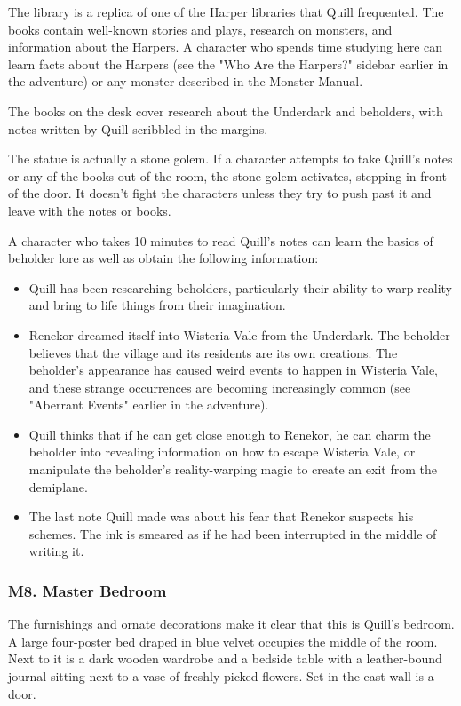 \documentclass[10pt,a4paper,twoside,bg=print,twocolumn,openany,nodeprecatedcode]{dndbook}
\begin{document}
The library is a replica of one of the Harper libraries that Quill frequented. The books contain well-known stories and plays, research on monsters, and information about the Harpers. A character who spends time studying here can learn facts about the Harpers (see the "Who Are the Harpers?" sidebar earlier in the adventure) or any monster described in the Monster Manual.

The books on the desk cover research about the Underdark and beholders, with notes written by Quill scribbled in the margins.

The statue is actually a stone golem. If a character attempts to take Quill's notes or any of the books out of the room, the stone golem activates, stepping in front of the door. It doesn't fight the characters unless they try to push past it and leave with the notes or books.

A character who takes 10 minutes to read Quill's notes can learn the basics of beholder lore as well as obtain the following information:


\begin{itemize}
\item Quill has been researching beholders, particularly their ability to warp reality and bring to life things from their imagination.
\item Renekor dreamed itself into Wisteria Vale from the Underdark. The beholder believes that the village and its residents are its own creations. The beholder's appearance has caused weird events to happen in Wisteria Vale, and these strange occurrences are becoming increasingly common (see "Aberrant Events" earlier in the adventure).
\item Quill thinks that if he can get close enough to Renekor, he can charm the beholder into revealing information on how to escape Wisteria Vale, or manipulate the beholder's reality-warping magic to create an exit from the demiplane.
\item The last note Quill made was about his fear that Renekor suspects his schemes. The ink is smeared as if he had been interrupted in the middle of writing it.
\end{itemize}

\subsubsection{M8. Master Bedroom}
\begin{DndReadAloud}{}
The furnishings and ornate decorations make it clear that this is Quill's bedroom. A large four-poster bed draped in blue velvet occupies the middle of the room. Next to it is a dark wooden wardrobe and a bedside table with a leather-bound journal sitting next to a vase of freshly picked flowers. Set in the east wall is a door.

\end{DndReadAloud}
\end{document}
